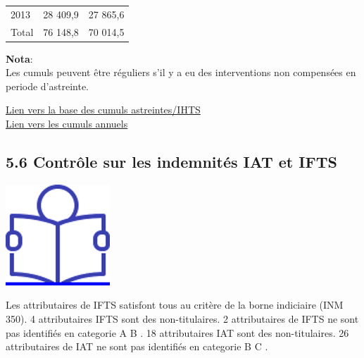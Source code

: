 \begin{longtable}[]{@{}lll@{}}
\begin{minipage}[t]{0.07\columnwidth}\raggedright
2013\strut
\end{minipage} & \begin{minipage}[t]{0.55\columnwidth}\raggedright
28 409,9\strut
\end{minipage} & \begin{minipage}[t]{0.29\columnwidth}\raggedright
27 865,6\strut
\end{minipage}\tabularnewline
\begin{minipage}[t]{0.07\columnwidth}\raggedright
Total\strut
\end{minipage} & \begin{minipage}[t]{0.55\columnwidth}\raggedright
76 148,8\strut
\end{minipage} & \begin{minipage}[t]{0.29\columnwidth}\raggedright
70 014,5\strut
\end{minipage}\tabularnewline
\bottomrule
\end{longtable}

\textbf{Nota}:\\
Les cumuls peuvent être réguliers s'il y a eu des interventions non
compensées en periode d'astreinte.

\href{../Bases/Reglementation/Controle_astreintes_HS_irreg.csv}{Lien vers
la base des cumuls astreintes/IHTS}\\
\href{../Bases/Reglementation/Cum_astreintes_HS_irreg.csv}{Lien vers les
cumuls annuels}

\hypertarget{controle-sur-les-indemnites-iat-et-ifts}{%
\subsection{5.6 Contrôle sur les indemnités IAT et
IFTS}\label{controle-sur-les-indemnites-iat-et-ifts}}

\href{../Docs/Notices/fiche_IAT_IFTS.odt}{\includegraphics{icones/Notice.png}}

Les attributaires de IFTS satisfont tous au critère de la borne
indiciaire (INM 350). 4 attributaires IFTS sont des non-titulaires. 2
attributaires de IFTS ne sont pas identifiés en categorie A B . 18
attributaires IAT sont des non-titulaires. 26 attributaires de IAT ne
sont pas identifiés en categorie B C .

